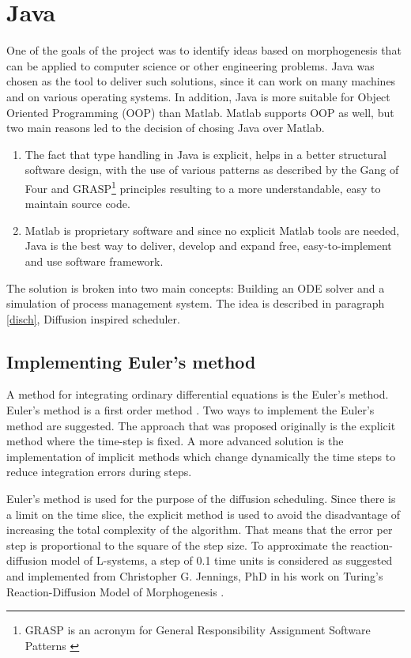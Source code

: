 	\section{Java}
    One of the goals of the project was to identify ideas based on morphogenesis that can be applied to computer science or other engineering problems. Java was chosen as the tool to deliver such solutions, since it can work on many machines and on various operating systems. In addition, Java is more suitable for Object Oriented Programming (OOP) than Matlab. Matlab supports OOP as well, but two main reasons led to the decision of chosing Java over Matlab.
    \begin{enumerate}
    \item The fact that type handling in Java is explicit, helps in a better structural software design, with the use of various patterns as described by the Gang of Four \cite{gamma_design_1998} and GRASP\footnote{GRASP is an acronym for General Responsibility Assignment Software Patterns \cite{larman_applying_2004}} principles \cite{larman_applying_2004} 
resulting to a more understandable, easy to maintain source code.
    \item Matlab is proprietary software and since no explicit Matlab tools are needed, Java is the best way to deliver, develop and expand free, easy-to-implement and use software framework.
    \end{enumerate}

    The solution is broken into two main concepts: Building an ODE solver and a simulation of process management system. The idea is described in paragraph \ref{disch}, Diffusion inspired scheduler.    

	\subsection{Implementing Euler's method}
    
A method for integrating ordinary differential equations is the Euler's method. Euler's method is a first order method \cite{koch_implicit_2000}. Two ways to implement the Euler's method are suggested. The approach that was proposed originally is the explicit method where the time-step is fixed. A more advanced solution is the implementation of implicit methods which change dynamically the time steps to reduce integration errors during steps. 

Euler's method is used for the purpose of the diffusion scheduling. Since there is a limit on the time slice,
the explicit method is used to avoid the disadvantage of increasing the total complexity of the algorithm.
That means that the error per step is proportional to the square of the step size. To approximate the reaction-diffusion model of L-systems, a step of 0.1 time units is considered as suggested and implemented from Christopher G. Jennings, PhD in his work on Turing's Reaction-Diffusion Model of Morphogenesis \cite{website:jennings}. 
    
